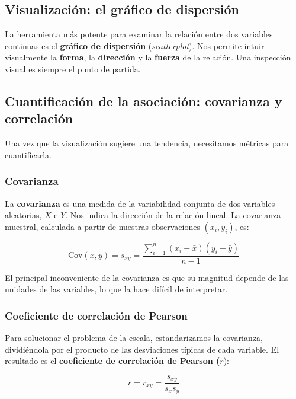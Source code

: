 \documentclass[
  letterpaper,
  DIV=11,
  numbers=noendperiod]{scrreprt}
\begin{document}
\subsection{Visualización: el gráfico de
dispersión}\label{visualizaciuxf3n-el-gruxe1fico-de-dispersiuxf3n}

La herramienta más potente para examinar la relación entre dos variables
continuas es el \textbf{gráfico de dispersión} (\emph{scatterplot}). Nos
permite intuir visualmente la \textbf{forma}, la \textbf{dirección} y la
\textbf{fuerza} de la relación. Una inspección visual es siempre el
punto de partida.

\subsection{Cuantificación de la asociación: covarianza y
correlación}\label{cuantificaciuxf3n-de-la-asociaciuxf3n-covarianza-y-correlaciuxf3n}

Una vez que la visualización sugiere una tendencia, necesitamos métricas
para cuantificarla.

\subsubsection{Covarianza}\label{covarianza}

La \textbf{covarianza} es una medida de la variabilidad conjunta de dos
variables aleatorias, \(X\) e \(Y\). Nos indica la dirección de la
relación lineal. La covarianza muestral, calculada a partir de nuestras
observaciones \((x_i, y_i)\), es:

\[
\text{Cov}(x, y) = s_{xy} = \frac{\sum_{i=1}^{n}(x_i - \bar{x})(y_i - \bar{y})}{n-1}
\]

El principal inconveniente de la covarianza es que su magnitud depende
de las unidades de las variables, lo que la hace difícil de interpretar.

\subsubsection{Coeficiente de correlación de
Pearson}\label{coeficiente-de-correlaciuxf3n-de-pearson}

Para solucionar el problema de la escala, estandarizamos la covarianza,
dividiéndola por el producto de las desviaciones típicas de cada
variable. El resultado es el \textbf{coeficiente de correlación de
Pearson (}\(r\)):

\[
r = r_{xy} = \frac{s_{xy}}{s_x s_y}
\]
\end{document}
